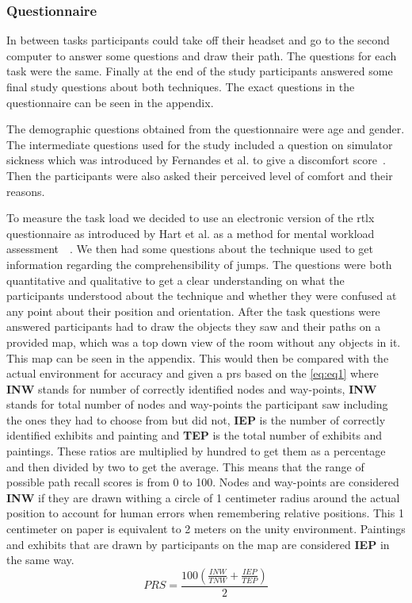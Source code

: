 \subsubsection{Questionnaire}
\label{subsubsection DPUS SP SP: User Feedback}
In between tasks participants could take off their headset and go to the second computer to answer some questions and draw their path. The questions for each task were the same. Finally at the end of the study participants answered some final study questions about both techniques. The exact questions in the questionnaire can be seen in the appendix.

The demographic questions obtained from the questionnaire were age and gender. The intermediate questions used for the study included a question on simulator sickness which was introduced by Fernandes et al. to give a discomfort score~\cite{Fernandes2016}. Then the participants were also asked their perceived level of comfort and their reasons.

To measure the task load we decided to use an electronic version of the \acrfull{rtlx} questionnaire as introduced by Hart et al. as a method for mental workload assessment~\cite{Hart1988}~\cite{Hart2006}. We then had some questions about the technique used to get information regarding the comprehensibility of jumps. The questions were both quantitative and qualitative to get a clear understanding on what the participants understood about the technique and whether they were confused at any point about their position and orientation. After the task questions were answered participants had to draw the objects they saw and their paths on a provided map, which was a top down view of the room without any objects in it. This map can be seen in the appendix. This would then be compared with the actual environment for accuracy and given a \acrfull{prs} based on the \cref{eq:eq1} where \textbf{INW} stands for number of correctly identified nodes and way-points, \textbf{INW} stands for total number of nodes and way-points the participant saw including the ones they had to choose from but did not, \textbf{IEP} is the number of correctly identified exhibits and painting and \textbf{TEP} is the total number of exhibits and paintings. These ratios are multiplied by hundred to get them as a percentage and then divided by two to get the average. This means that the range of possible path recall scores is from 0 to 100. Nodes and way-points are considered \textbf{INW} if they are drawn withing a circle of 1 centimeter radius around the actual position to account for human errors when remembering relative positions. This 1 centimeter on paper is equivalent to 2 meters on the unity environment. Paintings and exhibits that are drawn by participants on the map are considered \textbf{IEP} in the same way. 
\begin{equation}
	\label{eq:eq1}
	PRS = \frac{100\left(\frac{INW}{TNW} + \frac{IEP}{TEP}\right)}{2}
\end{equation}


